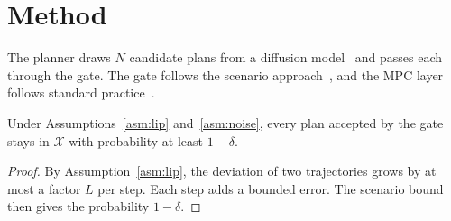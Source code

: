 \section{Method}\label{sec:method}
The planner draws $N$ candidate plans from a diffusion model~\cite{ho2020denoising} and passes
each through the gate. The gate follows the scenario approach~\cite{campi2008exact}, and the
MPC layer follows standard practice~\cite{rawlings2017model}.

\begin{theorem}\label{thm:main}
Under Assumptions~\ref{asm:lip} and~\ref{asm:noise}, every plan accepted by the gate stays in
$\mathcal{X}$ with probability at least $1-\delta$.
\end{theorem}

\begin{proof}
By Assumption~\ref{asm:lip}, the deviation of two trajectories grows by at most a factor $L$
per step. Each step adds a bounded error. The scenario bound
then gives the probability $1-\delta$.
\end{proof}
